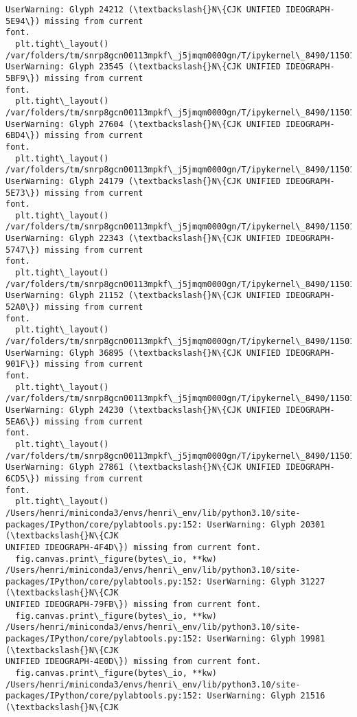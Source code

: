 \documentclass[11pt]{article}
\begin{document}
\begin{Verbatim}[commandchars=\\\{\}]
UserWarning: Glyph 24212 (\textbackslash{}N\{CJK UNIFIED IDEOGRAPH-5E94\}) missing from current
font.
  plt.tight\_layout()
/var/folders/tm/snrp8gcn00113mpkf\_j5jmqm0000gn/T/ipykernel\_8490/11501908.py:46:
UserWarning: Glyph 23545 (\textbackslash{}N\{CJK UNIFIED IDEOGRAPH-5BF9\}) missing from current
font.
  plt.tight\_layout()
/var/folders/tm/snrp8gcn00113mpkf\_j5jmqm0000gn/T/ipykernel\_8490/11501908.py:46:
UserWarning: Glyph 27604 (\textbackslash{}N\{CJK UNIFIED IDEOGRAPH-6BD4\}) missing from current
font.
  plt.tight\_layout()
/var/folders/tm/snrp8gcn00113mpkf\_j5jmqm0000gn/T/ipykernel\_8490/11501908.py:46:
UserWarning: Glyph 24179 (\textbackslash{}N\{CJK UNIFIED IDEOGRAPH-5E73\}) missing from current
font.
  plt.tight\_layout()
/var/folders/tm/snrp8gcn00113mpkf\_j5jmqm0000gn/T/ipykernel\_8490/11501908.py:46:
UserWarning: Glyph 22343 (\textbackslash{}N\{CJK UNIFIED IDEOGRAPH-5747\}) missing from current
font.
  plt.tight\_layout()
/var/folders/tm/snrp8gcn00113mpkf\_j5jmqm0000gn/T/ipykernel\_8490/11501908.py:46:
UserWarning: Glyph 21152 (\textbackslash{}N\{CJK UNIFIED IDEOGRAPH-52A0\}) missing from current
font.
  plt.tight\_layout()
/var/folders/tm/snrp8gcn00113mpkf\_j5jmqm0000gn/T/ipykernel\_8490/11501908.py:46:
UserWarning: Glyph 36895 (\textbackslash{}N\{CJK UNIFIED IDEOGRAPH-901F\}) missing from current
font.
  plt.tight\_layout()
/var/folders/tm/snrp8gcn00113mpkf\_j5jmqm0000gn/T/ipykernel\_8490/11501908.py:46:
UserWarning: Glyph 24230 (\textbackslash{}N\{CJK UNIFIED IDEOGRAPH-5EA6\}) missing from current
font.
  plt.tight\_layout()
/var/folders/tm/snrp8gcn00113mpkf\_j5jmqm0000gn/T/ipykernel\_8490/11501908.py:46:
UserWarning: Glyph 27861 (\textbackslash{}N\{CJK UNIFIED IDEOGRAPH-6CD5\}) missing from current
font.
  plt.tight\_layout()
/Users/henri/miniconda3/envs/henri\_env/lib/python3.10/site-
packages/IPython/core/pylabtools.py:152: UserWarning: Glyph 20301 (\textbackslash{}N\{CJK
UNIFIED IDEOGRAPH-4F4D\}) missing from current font.
  fig.canvas.print\_figure(bytes\_io, **kw)
/Users/henri/miniconda3/envs/henri\_env/lib/python3.10/site-
packages/IPython/core/pylabtools.py:152: UserWarning: Glyph 31227 (\textbackslash{}N\{CJK
UNIFIED IDEOGRAPH-79FB\}) missing from current font.
  fig.canvas.print\_figure(bytes\_io, **kw)
/Users/henri/miniconda3/envs/henri\_env/lib/python3.10/site-
packages/IPython/core/pylabtools.py:152: UserWarning: Glyph 19981 (\textbackslash{}N\{CJK
UNIFIED IDEOGRAPH-4E0D\}) missing from current font.
  fig.canvas.print\_figure(bytes\_io, **kw)
/Users/henri/miniconda3/envs/henri\_env/lib/python3.10/site-
packages/IPython/core/pylabtools.py:152: UserWarning: Glyph 21516 (\textbackslash{}N\{CJK

\end{Verbatim}
\end{document}
